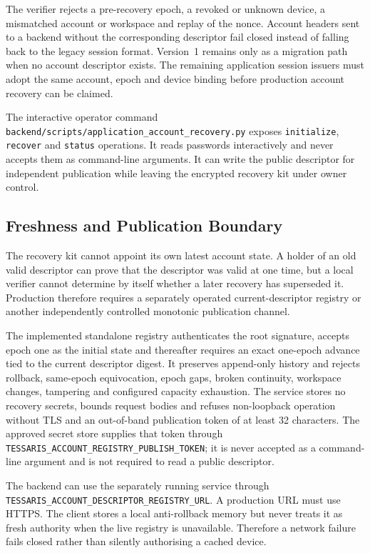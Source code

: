 The verifier rejects a pre-recovery epoch, a revoked or unknown device, a
mismatched account or workspace and replay of the nonce.  Account headers sent
to a backend without the corresponding descriptor fail closed instead of
falling back to the legacy session format.  Version~1 remains only as a
migration path when no account descriptor exists.  The remaining application
session issuers must adopt the same account, epoch and device binding before
production account recovery can be claimed.

The interactive operator command
\texttt{backend/scripts/application\_account\_recovery.py} exposes
\texttt{initialize}, \texttt{recover} and \texttt{status} operations.  It reads
passwords interactively and never accepts them as command-line arguments.  It
can write the public descriptor for independent publication while leaving the
encrypted recovery kit under owner control.

\subsection{Freshness and Publication Boundary}

The recovery kit cannot appoint its own latest account state.  A holder of an
old valid descriptor can prove that the descriptor was valid at one time, but
a local verifier cannot determine by itself whether a later recovery has
superseded it.  Production therefore requires a separately operated
current-descriptor registry or another independently controlled monotonic
publication channel.

The implemented standalone registry authenticates the root signature, accepts
epoch one as the initial state and thereafter requires an exact one-epoch
advance tied to the current descriptor digest.  It preserves append-only
history and rejects rollback, same-epoch equivocation, epoch gaps, broken
continuity, workspace changes, tampering and configured capacity exhaustion.
The service stores no recovery secrets, bounds request bodies and refuses
non-loopback operation without TLS and an out-of-band publication token of at
least 32 characters.  The approved secret store supplies that token through
\texttt{TESSARIS\_ACCOUNT\_REGISTRY\_PUBLISH\_TOKEN}; it is never accepted as a
command-line argument and is not required to read a public descriptor.

The backend can use the separately running service through
\texttt{TESSARIS\_ACCOUNT\_DESCRIPTOR\_REGISTRY\_URL}.  A production URL must
use HTTPS.  The client stores a local anti-rollback memory but never treats it
as fresh authority when the live registry is unavailable.  Therefore a network
failure fails closed rather than silently authorising a cached device.

